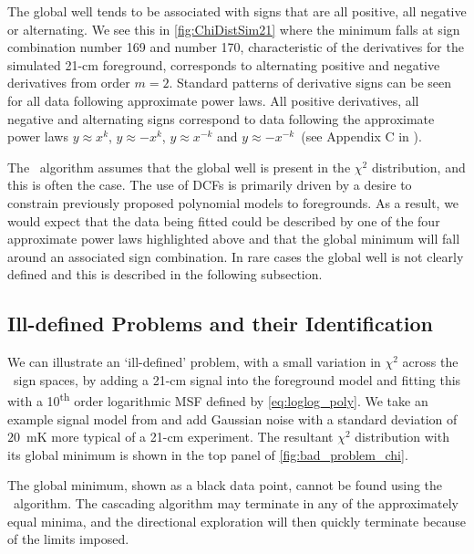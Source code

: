 The global well tends to be associated with signs that are all positive, all negative or alternating. We see this in \cref{fig:ChiDistSim21} where the minimum falls at sign combination number 169 and number 170, characteristic of the derivatives for the simulated 21-cm foreground, corresponds to alternating positive and negative derivatives from order $m = 2$. Standard patterns of derivative signs can be seen for all data following approximate power laws. All positive derivatives, all negative and alternating signs correspond to data following the approximate power laws $y\approx x^{k}$, $y\approx -x^{k}$, $y\approx x^{-k}$ and $y\approx -x^{-k}$~(see Appendix C in \cite{Bevins_maxsmooth_2021}). 

The \maxsmooth~algorithm assumes that the global well is present in the $\chi^2$ distribution, and this is often the case. The use of DCFs is primarily driven by a desire to constrain previously proposed polynomial models to foregrounds. As a result, we would expect that the data being fitted could be described by one of the four approximate power laws highlighted above and that the global minimum will fall around an associated sign combination. In rare cases the global well is not clearly defined and this is described in the following subsection.

\subsection{Ill-defined Problems and their Identification}
\label{sec:badproblems}

We can illustrate an `ill-defined' problem, with a small variation in $\chi^2$ across the \maxsmooth~sign spaces, by adding a 21-cm signal into the foreground model and fitting this with a 10\textsuperscript{th} order logarithmic MSF defined by \cref{eq:loglog_poly}. We take an example signal model from \cite{Cohen_global_2017} and add Gaussian noise with a standard deviation of $20$~mK more typical of a 21-cm experiment. The resultant $\chi^2$ distribution with its global minimum is shown in the top panel of \cref{fig:bad_problem_chi}.

The global minimum, shown as a black data point, cannot be found using the \maxsmooth~algorithm. The cascading algorithm may terminate in any of the approximately equal minima, and the directional exploration will then quickly terminate because of the limits imposed.

